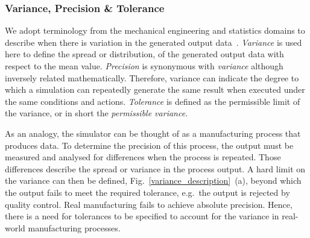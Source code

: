 \documentclass[runningheads,twocolumn,a4paper,10pt]{llncs}
\begin{document}
\subsubsection{Variance, Precision \& Tolerance}

We adopt terminology from the mechanical engineering and statistics domains to describe when there is variation in the generated output data~\cite{ADictionaryofMechanicalEngineering}.
%
%
\textit{Variance} is used here to define the spread or distribution, of the generated output data with respect to the mean value. \textit{Precision} is synonymous with \textit{variance} although inversely related mathematically. 
%
Therefore, variance can indicate the degree to which a simulation can repeatedly generate the same result when executed under the same conditions and actions.
%
\textit{Tolerance} is defined as the permissible limit of the variance, or in short the \textit{permissible variance}. 

%
As an analogy, the simulator can be thought of as a manufacturing process that produces data. To determine the precision of this process, the output must be measured and analysed for differences when the process is repeated. 
%
Those differences describe the spread or variance in the process output. A hard limit on the variance can then be defined, Fig.~\ref{variance_description}~(a), beyond which the output fails to meet the required tolerance, e.g.\ the output is rejected by quality control.
%
%
Real manufacturing fails to achieve absolute precision. Hence, there is a need for tolerances to be specified to account for the variance in real-world manufacturing processes. 
\end{document}
